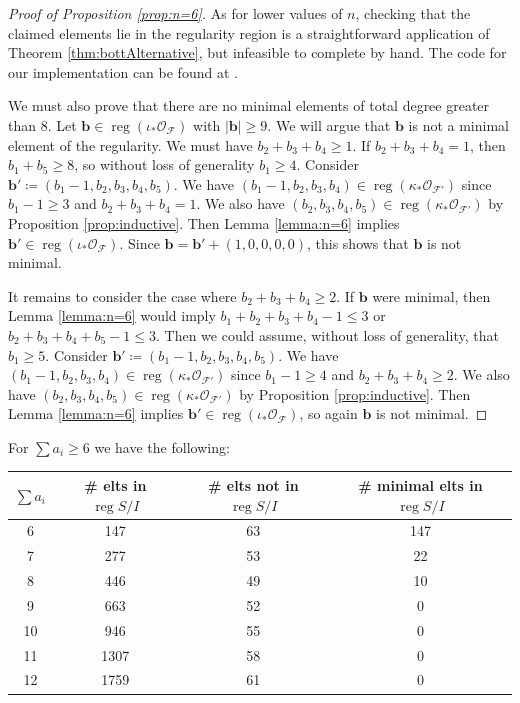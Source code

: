 \documentclass[12pt,reqno]{amsart}
\theoremstyle{definition}
\theoremstyle{remark}
\newcommand{\reg}{\operatorname{reg}}
\newcommand{\calF}{{\mathcal{F}}}
\newcommand{\calO}{{\mathcal{O}}}
\begin{document}
\begin{proof}[Proof of Proposition \ref{prop:n=6}]
As for lower values of $n$, checking that the claimed elements lie in the regularity region is a straightforward application of Theorem \ref{thm:bottAlternative}, but infeasible to complete by hand.  The code for our implementation can be found at \cite{githubRepo}.  

We must also prove that there are no minimal elements of total degree greater than $8$.  Let $\mathbf b \in \reg(\iota_*\calO_{\calF})$ with $|\mathbf b| \geq 9$.  We will argue that $\mathbf b$ is not a minimal element of the regularity.  We must have $b_2+b_3+b_4 \geq 1$.  If $b_2+b_3+b_4 = 1$, then $b_1+b_5 \geq 8$, so without loss of generality $b_1 \geq 4$.  Consider $\mathbf b' \coloneqq (b_1-1,b_2,b_3,b_4,b_5)$.  We have $(b_1-1,b_2,b_3,b_4) \in \reg(\kappa_*\calO_{\calF'})$ since $b_1-1 \geq 3$ and $b_2+b_3+b_4 = 1$.  We also have $(b_2,b_3,b_4,b_5) \in \reg(\kappa_*\calO_{\calF'})$ by Proposition \ref{prop:inductive}.  Then Lemma \ref{lemma:n=6} implies $\mathbf b' \in \reg(\iota_*\calO_{\calF})$.  Since $\mathbf b = \mathbf b' + (1,0,0,0,0)$, this shows that $\mathbf b$ is not minimal.

It remains to consider the case where $b_2+b_3+b_4 \geq 2$.  If $\mathbf b$ were minimal, then Lemma \ref{lemma:n=6} would imply $b_1+b_2+b_3+b_4-1 \leq 3$ or $b_2+b_3+b_4+b_5-1 \leq 3$.  Then we could assume, without loss of generality, that $b_1\geq 5$.  Consider $\mathbf b' \coloneqq (b_1-1, b_2,b_3,b_4,b_5)$.  We have $(b_1-1, b_2,b_3,b_4) \in \reg(\kappa_*\calO_{\calF'})$ since $b_1-1 \geq 4$ and $b_2+b_3+b_4 \geq 2$.  We also have $(b_2,b_3,b_4,b_5) \in \reg(\kappa_*\calO_{\calF'})$ by Proposition \ref{prop:inductive}.  Then Lemma \ref{lemma:n=6} implies $\mathbf b' \in \reg(\iota_*\calO_{\calF})$, so again $\mathbf b$ is not minimal.
\end{proof}

\iffalse
For $\sum a_i \geq 6$ we have the following:

\begin{center}
\begin{tabular}{ |c|c|c|c| } 
 \hline
$\sum a_i$ & \# elts in $\reg S/I$ & \# elts not in $\reg S/I$ & \# minimal elts in $\reg S/I$\\
  \hline
6 & 147 & 63 & 147 \\ 
  \hline
 7 & 277 & 53 & 22 \\ 
 \hline
 8 & 446 & 49 & 10 \\ 
 \hline
 9 & 663 & 52 & 0 \\ 
 \hline
 10 & 946 & 55 & 0 \\ 
 \hline
 11 & 1307 & 58 & 0 \\ 
 \hline
 12 & 1759 & 61 & 0 \\ 
 \hline
\end{tabular}
\end{center}
\end{document}
